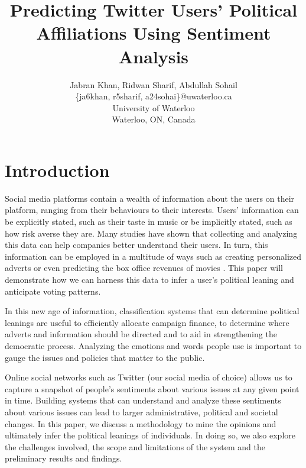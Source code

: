 \documentclass[letterpaper]{article} %
\begin{document}
%
\title{Predicting Twitter Users' Political Affiliations Using Sentiment Analysis}
\author{Jabran Khan, Ridwan Sharif, Abdullah Sohail\\
\{ja6khan, r5sharif, a24sohai\}@uwaterloo.ca\\
University of Waterloo\\
Waterloo, ON, Canada\\
}
\maketitle



\section{Introduction} 

Social media platforms contain a wealth of information about the users on their platform, ranging from their behaviours to their interests. Users’ information can be explicitly stated, such as their taste in music or be implicitly stated, such as how risk averse they are. Many studies have shown that collecting and analyzing this data can help companies better understand their users. In turn, this information can be employed in a multitude of ways such as creating personalized adverts or even predicting the box office revenues of movies \cite{asurPredicting}. This paper will demonstrate how we can harness this data to infer a user's political leaning and anticipate voting patterns.

In this new age of information, classification systems that can determine political leanings are useful to efficiently allocate campaign finance, to determine where adverts and information should be directed and to aid in strengthening the democratic process. Analyzing the emotions and words people use is important to gauge the issues and policies that matter to the public.

Online social networks such as Twitter (our social media of choice) allows us to capture a snapshot of people’s sentiments about various issues at any given point in time. Building systems that can understand and analyze these sentiments about various issues can lead to larger administrative, political and societal changes.  In this paper, we discuss a methodology to mine the opinions and ultimately infer the political leanings of individuals. In doing so, we also explore the challenges involved, the scope and limitations of the system and the preliminary results and findings.
\end{document}
